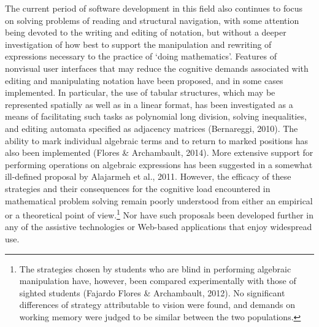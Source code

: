 \documentclass[11.5pt]{sig-alternate} %
\begin{document}
\begin{large}
The current period of software development in this field also continues to focus on solving problems of reading and structural navigation, with some attention being devoted to the writing and editing of notation, but without a deeper investigation of how best to support the manipulation and rewriting of expressions necessary to the practice of ‘doing mathematics’. Features of nonvisual user interfaces that may reduce the cognitive demands associated with editing and manipulating notation have been proposed, and in some cases implemented. In particular, the use of tabular structures, which may be represented spatially as well as in a linear format, has been investigated as a means of facilitating such tasks as polynomial long division, solving inequalities, and editing automata specified as adjacency matrices (Bernareggi, 2010). The ability to mark individual algebraic terms and to return to marked positions has also been implemented (Flores \& Archambault, 2014). More extensive support for performing operations on algebraic expressions has been suggested in a somewhat ill-defined proposal by Alajarmeh et al., 2011. However, the efficacy of these strategies and their consequences for the cognitive load encountered in mathematical problem solving remain poorly understood from either an empirical or a theoretical point of view.\footnote{The strategies chosen by students who are blind in performing algebraic manipulation have, however, been compared experimentally with those of sighted students (Fajardo Flores \& Archambault, 2012). No significant differences of strategy attributable to vision were found, and demands on working memory were judged to be similar between the two populations.} Nor have such proposals been developed further in any of the assistive technologies or Web-based applications that enjoy widespread use.


\end{large}
\end{document}
